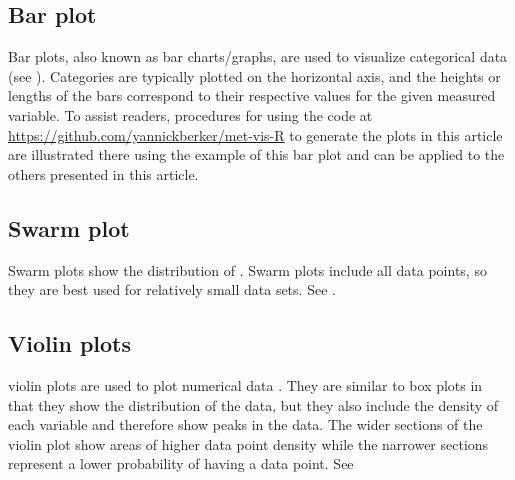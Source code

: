 \documentclass[AMA,LATO1COL]{WileyNJD-v2}
\begin{document}
\subsection{Bar plot}

Bar plots, also known as bar charts/graphs, are used to visualize categorical
data (see ). Categories are typically plotted on the horizontal axis,
and the heights or lengths of the bars correspond to their respective values for
the given measured variable. To assist readers, procedures for using the code at
\url{https://github.com/yannickberker/met-vis-R} to generate the plots in this
article are illustrated there using the example of this bar plot and can be
applied to the others presented in this article.

\begin{figure}
    \centering
\end{figure}

\subsection{Swarm plot}

Swarm plots show the distribution of . Swarm plots include all data points, so
they are best used for relatively small data sets. See .

\begin{figure}
    \centering
\end{figure}

\subsection{Violin plots}

 violin plots are used to plot
 numerical data .
They are similar to box plots in that they show the distribution of the data,
but they also include the density of each variable and therefore show peaks in
the data. The wider sections of the violin plot show areas of higher data point
density while the narrower sections represent a lower probability of having a
data point. See  
\end{document}
